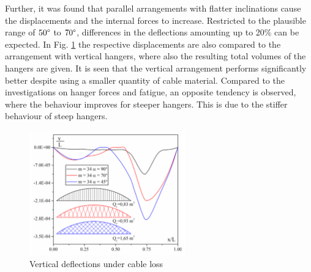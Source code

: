 Further, it was found that parallel arrangements with flatter inclinations cause the displacements and the internal forces to increase. Restricted to the plausible range of $50\degree$ to $70\degree$, differences in the deflections amounting up to 20\% can be expected. In Fig. \ref{fig:Bruno2} the respective displacements are also compared to the arrangement with vertical hangers, where also the resulting total volumes of the hangers are given. It is seen that the vertical arrangement performs significantly better despite using a smaller quantity of cable material. Compared to the investigations on hanger forces and fatigue, an opposite tendency is observed, where the behaviour improves for steeper hangers. This is due to the stiffer behaviour of steep hangers.
\begin{figure}[H]
    \centering
    \includegraphics[width=0.6\textwidth]{Pictures/BrunoArrangements.PNG}
    \caption{Vertical deflections under cable loss \citep{Bruno}}
    \label{fig:Bruno2}
\end{figure}

